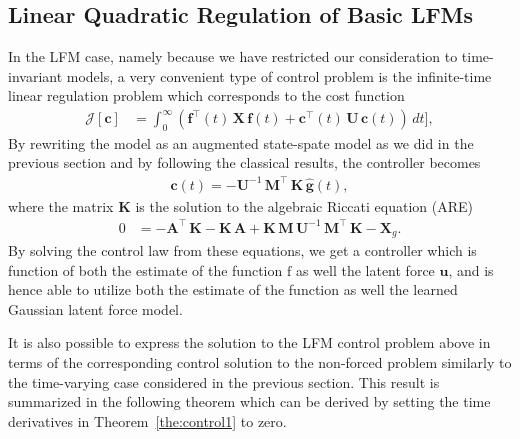 \documentclass[journal]{IEEEtran}
\begin{document}
\subsection{Linear Quadratic Regulation of Basic LFMs}
%
In the LFM case, namely because we have restricted our consideration to time-invariant models, a very convenient type of control problem is the infinite-time linear regulation problem which corresponds to the cost function
%
\begin{equation}
\begin{split}
  \mathcal{J}[\mathbf{c}] &= \int_0^\infty
   (\mathbf{f}^{\top}(t) \, \mathbf{X} \, \mathbf{f}(t)
  + \mathbf{c}^{\top}(t) \, \mathbf{U} \, \mathbf{c}(t)) \, dt \Big],
\end{split}
\end{equation}
%
By rewriting the model as an augmented state-spate model as we did in the previous section and by following the classical results, the controller becomes
%
\begin{equation}
\begin{split}
  \mathbf{c}(t) = - \mathbf{U}^{-1} \, \mathbf{M}^{\top} \, \mathbf{K}\, \hat{\mathbf{g}}(t),
\end{split}
\label{eq:joint_control}
\end{equation}
%
where the matrix $\mathbf{K}$ is the solution to the algebraic Riccati equation (ARE) 
%
\begin{equation}
\begin{split}
  0 &=
    -\mathbf{A}^{\top} \, \mathbf{K} - \mathbf{K} \, \mathbf{A} 
  +  \mathbf{K} \, \mathbf{M} \, \mathbf{U}^{-1} \,
   \mathbf{M}^{\top} \, \mathbf{K} - \mathbf{X}_g.
\end{split}
\label{eq:joint_are}
\end{equation}
%
By solving the control law from these equations, we get a controller which is function of both the estimate of the function $\mathrm{f}$ as well the latent force $\mathbf{u}$, and is hence able to utilize both the estimate of the function as well the learned Gaussian latent force model.

It is also possible to express the solution to the LFM control problem above in terms of the corresponding control solution to the non-forced problem similarly to the time-varying case considered in the previous section. This result is summarized in the following theorem which can be derived by setting the time derivatives in Theorem~\ref{the:control1} to zero.
\end{document}
